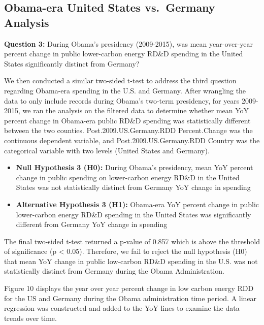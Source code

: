 \documentclass[
  12pt,
]{article}
\begin{document}
\hypertarget{obama-era-united-states-vs.-germany-analysis}{%
\subsection{Obama-era United States vs.~Germany
Analysis}\label{obama-era-united-states-vs.-germany-analysis}}

\textbf{Question 3:} During Obama's presidency (2009-2015), was mean
year-over-year percent change in public lower-carbon energy RD\&D
spending in the United States significantly distinct from Germany?

We then conducted a similar two-sided t-test to address the third
question regarding Obama-era spending in the U.S. and Germany. After
wrangling the data to only include records during Obama's two-term
presidency, for years 2009-2015, we ran the analysis on the filtered
data to determine whether mean YoY percent change in Obama-era public
RD\&D spending was statistically different between the two counties.
Post.2009.US.Germany.RDD Percent.Change was the continuous dependent
variable, and Post.2009.US.Germany.RDD Country was the categorical
variable with two levels (United States and Germany).

\begin{itemize}
\item
  \textbf{Null Hypothesis 3 (H0):} During Obama's presidency, mean YoY
  percent change in public spending on lower-carbon energy RD\&D in the
  United States was not statistically distinct from Germany YoY change
  in spending
\item
  \textbf{Alternative Hypothesis 3 (H1):} Obama-era YoY percent change
  in public lower-carbon energy RD\&D spending in the United States was
  significantly different from Germany YoY change in spending
\end{itemize}

The final two-sided t-test returned a p-value of 0.857 which is above
the threshold of significance (p \textless{} 0.05). Therefore, we fail
to reject the null hypothesis (H0) that mean YoY change in public
low-carbon RD\&D spending in the U.S. was not statistically distinct
from Germany during the Obama Administration.

Figure 10 displays the year over year percent change in low carbon
energy RDD for the US and Germany during the Obama administration time
period. A linear regression was constructed and added to the YoY lines
to examine the data trends over time.

\newpage
\end{document}
